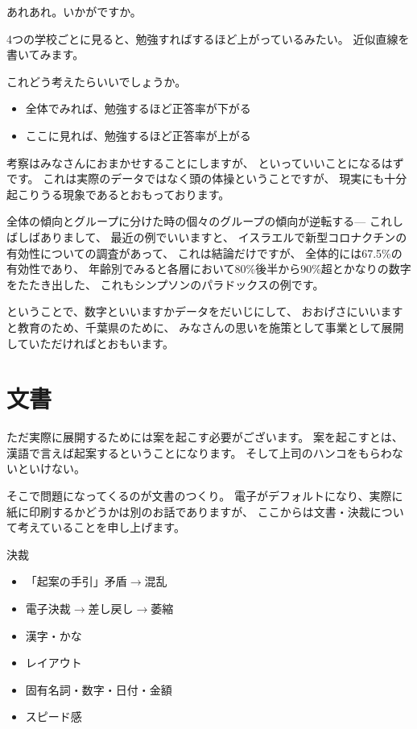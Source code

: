 \documentclass[uplatex,jis2004,dvipdfmx,12pt]{jsarticle}
\begin{document}
あれあれ。いかがですか。

4つの学校ごとに見ると、勉強すればするほど上がっているみたい。
近似直線を書いてみます。

これどう考えたらいいでしょうか。

\begin{itemize}
 \item 全体でみれば、勉強するほど正答率が下がる
 \item ここに見れば、勉強するほど正答率が上がる
\end{itemize}
考察はみなさんにおまかせすることにしますが、
といっていいことになるはずです。
これは実際のデータではなく頭の体操ということですが、
現実にも十分起こりうる現象であるとおもっております。

全体の傾向とグループに分けた時の個々のグループの傾向が逆転する---
これしばしばありまして、
最近の例でいいますと、
イスラエルで新型コロナクチンの有効性についての調査があって、
これは結論だけですが、
全体的には67.5\%の有効性であり、
年齢別でみると各層において80\%後半から90\%超とかなりの数字をたたき出した、
これもシンプソンのパラドックスの例です。

ということで、数字といいますかデータをだいじにして、
おおげさにいいますと教育のため、千葉県のために、
みなさんの思いを施策として事業として展開していただければとおもいます。


\section{文書}
ただ実際に展開するためには案を起こす必要がございます。
案を起こすとは、漢語で言えば起案するということになります。
そして上司のハンコをもらわないといけない。

そこで問題になってくるのが文書のつくり。
電子がデフォルトになり、実際に紙に印刷するかどうかは別のお話でありますが、
ここからは文書・決裁について考えていることを申し上げます。

決裁
       \begin{itemize}
	\item 「起案の手引」矛盾$\longrightarrow${}混乱
	\item 電子決裁$\longrightarrow${}差し戻し$\longrightarrow${}萎縮
	\item 漢字・かな
	\item レイアウト
	\item 固有名詞・数字・日付・金額
	\item スピード感
   \end{itemize}
\end{document}
